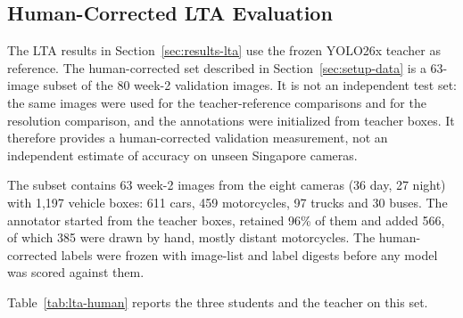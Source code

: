 
\subsection{Human-Corrected LTA Evaluation}\label{sec:results-human-lta}

The LTA results in Section~\ref{sec:results-lta} use the frozen YOLO26x teacher
as reference. The human-corrected set described in Section~\ref{sec:setup-data}
is a 63-image subset of the 80 week-2 validation images. It is not an
independent test set: the same images were used for the teacher-reference
comparisons and for the resolution comparison, and the annotations were
initialized from teacher boxes. It therefore provides a human-corrected
validation measurement, not an independent estimate of accuracy on unseen
Singapore cameras.

The subset contains 63 week-2 images from the eight cameras (36 day, 27 night)
with 1,197 vehicle boxes: 611 cars, 459 motorcycles, 97 trucks and 30 buses. The
annotator started from the teacher boxes, retained 96\% of them and added 566,
of which 385 were drawn by hand, mostly distant motorcycles. The human-corrected labels
were frozen with image-list and label digests before any model was scored against
them.

Table~\ref{tab:lta-human} reports the three students and the teacher on this
set.

